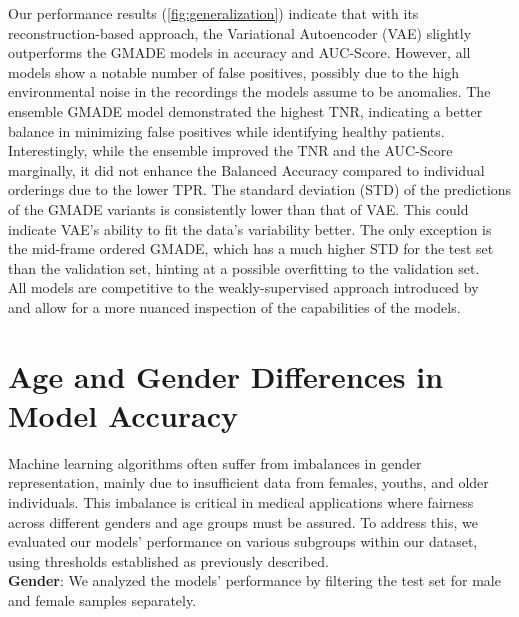 Our performance results (\autoref{fig:generalization}) indicate that with its reconstruction-based approach, the Variational Autoencoder (VAE) slightly outperforms the GMADE models in accuracy and AUC-Score. However, all models show a notable number of false positives, possibly due to the high environmental noise in the recordings the models assume to be anomalies. The ensemble GMADE model demonstrated the highest TNR, indicating a better balance in minimizing false positives while identifying healthy patients. Interestingly, while the ensemble improved the TNR and the AUC-Score marginally, it did not enhance the Balanced Accuracy compared to individual orderings due to the lower TPR. The standard deviation (STD) of the predictions of the GMADE variants is consistently lower than that of VAE. This could indicate VAE's ability to fit the data's variability better. The only exception is the mid-frame ordered GMADE, which has a much higher STD for the test set than the validation set, hinting at a possible overfitting to the validation set.\\
All models are competitive to the weakly-supervised approach introduced by~\cite{cozzatti2022variational} and allow for a more nuanced inspection of the capabilities of the models.
\section{Age and Gender Differences in Model Accuracy}
Machine learning algorithms often suffer from imbalances in gender representation, mainly due to insufficient data from females, youths, and older individuals. This imbalance is critical in medical applications where fairness across different genders and age groups must be assured. To address this, we evaluated our models' performance on various subgroups within our dataset, using thresholds established as previously described.\\
\textbf{Gender}: We analyzed the models' performance by filtering the test set for male and female samples separately.

